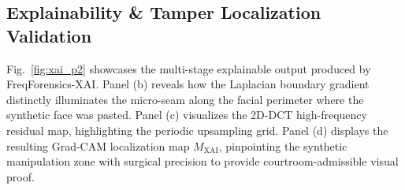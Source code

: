 \documentclass[journal]{IEEEtran}
\begin{document}
\subsection{Explainability \& Tamper Localization Validation}
Fig.~\ref{fig:xai_p2} showcases the multi-stage explainable output produced by FreqForensics-XAI. Panel (b) reveals how the Laplacian boundary gradient distinctly illuminates the micro-seam along the facial perimeter where the synthetic face was pasted. Panel (c) visualizes the 2D-DCT high-frequency residual map, highlighting the periodic upsampling grid. Panel (d) displays the resulting Grad-CAM localization map $M_{\text{XAI}}$, pinpointing the synthetic manipulation zone with surgical precision to provide courtroom-admissible visual proof.

\begin{table}[!t]
\caption{Fine-Grained Classification Metrics Across Evaluated Generative Families}
\label{tab:metrics_p2}
\centering
{}
\end{table}

\begin{table}[!t]
\caption{Statistical Significance Matrix and Paired t-Test Comparisons}
\label{tab:stat_p2}
\centering
{}
\end{table}
\end{document}
